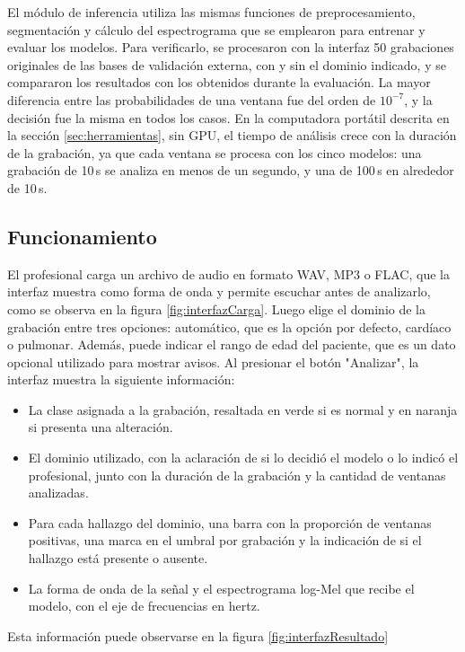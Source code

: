 El módulo de inferencia utiliza las mismas funciones de preprocesamiento, segmentación y cálculo
del espectrograma que se emplearon para entrenar y evaluar los modelos.
Para verificarlo, se procesaron con la interfaz 50 grabaciones originales de las
bases de validación externa, con y sin el dominio indicado, y se compararon los resultados con los
obtenidos durante la evaluación. La mayor diferencia entre las probabilidades de una ventana fue
del orden de $10^{-7}$, y la decisión fue la misma en todos los casos. En la computadora portátil
descrita en la sección \ref{sec:herramientas}, sin GPU, el tiempo de análisis crece con la duración 
de la grabación, ya que cada ventana se procesa con los cinco modelos: una grabación de 10\,s se 
analiza en menos de un segundo, y una de 100\,s en alrededor de 10\,s.

\subsection{Funcionamiento}
\label{subsec:funcionamiento}

El profesional carga un archivo de audio en formato WAV, MP3 o FLAC, que la interfaz muestra como
forma de onda y permite escuchar antes de analizarlo, como se observa en la figura
\ref{fig:interfazCarga}. Luego elige el dominio de la grabación entre tres opciones: automático, que
es la opción por defecto, cardíaco o pulmonar. Además, puede indicar el rango de edad del paciente, 
que es un dato opcional utilizado para mostrar avisos. Al presionar el botón "Analizar", la
interfaz muestra la siguiente información:

\begin{itemize}
	\item La clase asignada a la grabación, resaltada en verde si es normal y en naranja si
	presenta una alteración.
	\item El dominio utilizado, con la aclaración de si lo decidió el modelo o lo indicó el
	profesional, junto con la duración de la grabación y la cantidad de ventanas analizadas.
	\item Para cada hallazgo del dominio, una barra con la proporción de ventanas positivas, una
	marca en el umbral por grabación y la indicación de si el hallazgo está presente o ausente.
	\item La forma de onda de la señal y el espectrograma log-Mel que recibe el modelo, con el eje
	de frecuencias en hertz.
\end{itemize}

Esta información puede observarse en la figura \ref{fig:interfazResultado}


